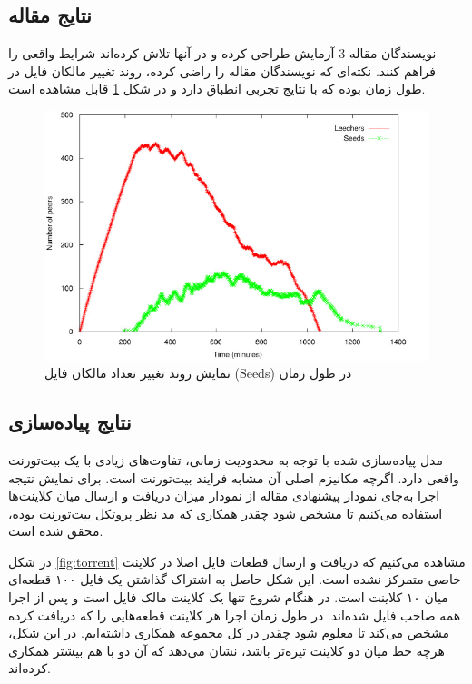 \documentclass{article}
\begin{document}
\subsection{نتایج مقاله}
نویسندگان مقاله 3 آزمایش طراحی کرده و در آنها تلاش کرده‌اند شرایط واقعی را فراهم کنند. نکته‌ای که نویسندگان مقاله را راضی کرده، روند تغییر مالکان فایل در طول زمان بوده که با نتایج تجربی انطباق دارد و در شکل \ref{fig:experiment} قابل مشاهده است.

\begin{figure} \centerline{\includegraphics{experiment}} \caption{\label{fig:experiment}
 نمایش روند تغییر تعداد مالکان فایل (Seeds) در طول زمان
 } \end{figure}

\subsection{نتایج پیاده‌سازی}
مدل پیاده‌سازی شده با توجه به محدودیت زمانی، تفاوت‌های زیادی با یک بیت‌تورنت واقعی دارد. اگرچه مکانیزم اصلی آن مشابه فرایند بیت‌تورنت است. برای نمایش نتیجه اجرا به‌جای نمودار پیشنهادی مقاله از نمودار میزان دریافت و ارسال میان کلاینت‌ها استفاده می‌کنیم تا مشخص شود چقدر همکاری که مد نظر پروتکل بیت‌تورنت بوده، محقق شده است.

در شکل \ref{fig:torrent} مشاهده می‌کنیم که دریافت و ارسال قطعات فایل اصلا در کلاینت خاصی متمرکز نشده است. این شکل حاصل به اشتراک گذاشتن یک فایل ۱۰۰ قطعه‌ای میان ۱۰ کلاینت است. در هنگام شروع تنها یک کلاینت مالک فایل است و پس از اجرا همه صاحب فایل شده‌اند. در طول زمان اجرا هر کلاینت قطعه‌هایی را که دریافت کرده مشخص می‌کند تا معلوم شود چقدر در کل مجموعه همکاری داشته‌ایم. در این شکل، هرچه خط میان دو کلاینت تیره‌تر باشد، نشان می‌دهد که آن دو با هم بیشتر همکاری کرده‌اند.
 
\end{document}
